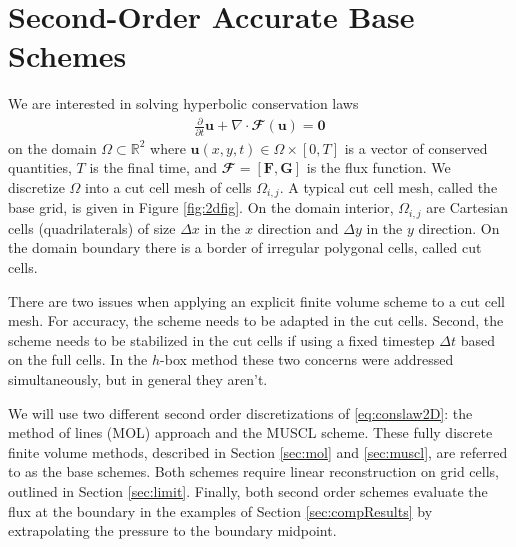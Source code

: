 \section{Second-Order Accurate Base Schemes}\label{sec:basefv}
We are interested in solving hyperbolic conservation laws 
\begin{equation}
\begin{aligned} \label{eq:conslaw2D}
\frac{\partial}{\partial t}	\mathbf{u} + \nabla \cdot
\mathbfcal{F}(\mathbf{u})  = \mathbf{0}
\end{aligned}
\end{equation}
on the domain $\Omega \subset \mathbb{R}^2$ where $\mathbf{u}(x,y,t) \in \Omega \times [0,T]$ is a vector of conserved quantities, $T$ is the final time, and $\mathbfcal{F} = [\mathbf{F}, \mathbf{G}]$ is the flux function.  We discretize $\Omega$ into a cut cell mesh of cells $\Omega_{i,j}$.  A typical cut cell mesh, called the base grid, is given in Figure \ref{fig:2dfig}.  On the domain interior, $\Omega_{i,j}$ are Cartesian cells (quadrilaterals) of size $\Delta x$ in the $x$ direction and $\Delta y$ in the $y$ direction.  On the domain boundary there is a border of irregular polygonal cells, called cut cells.  



There are two issues when applying an explicit finite volume scheme to a cut cell
mesh.  For accuracy, the scheme needs to be adapted in the cut cells. Second, 
the scheme needs to be stabilized in the cut cells if using a fixed timestep $\Delta t$ 
based on the full cells. In the $h$-box method these two concerns were addressed
simultaneously, but in general they aren't.

We will use two different second order discretizations of \eqref{eq:conslaw2D}: the method of lines
(MOL) approach and the MUSCL scheme.
These fully discrete finite volume methods, described in Section \ref{sec:mol} and \ref{sec:muscl},
are referred to as the base schemes.  Both schemes require linear 
reconstruction on grid cells,
outlined in Section \ref{sec:limit}.  
Finally, both second order schemes evaluate the flux at
the boundary in the examples of Section \ref{sec:compResults} by extrapolating the
pressure to the boundary midpoint. 

